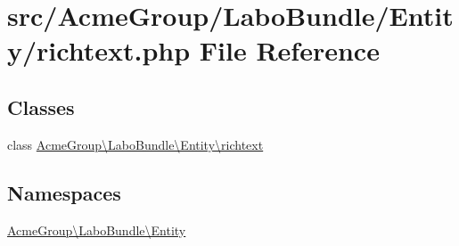 \hypertarget{richtext_8php}{\section{src/\+Acme\+Group/\+Labo\+Bundle/\+Entity/richtext.php File Reference}
\label{richtext_8php}
}
\subsection*{Classes}
\begin{DoxyCompactItemize}
\item 
class \hyperlink{class_acme_group_1_1_labo_bundle_1_1_entity_1_1richtext}{Acme\+Group\textbackslash{}\+Labo\+Bundle\textbackslash{}\+Entity\textbackslash{}richtext}
\end{DoxyCompactItemize}
\subsection*{Namespaces}
\begin{DoxyCompactItemize}
\item 
 \hyperlink{namespace_acme_group_1_1_labo_bundle_1_1_entity}{Acme\+Group\textbackslash{}\+Labo\+Bundle\textbackslash{}\+Entity}
\end{DoxyCompactItemize}

